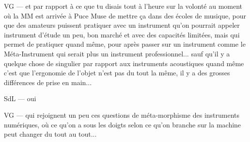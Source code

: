 VG — et par rapport à ce que tu disais tout à l'heure sur la volonté au moment où la MM est arrivée à Puce Muse de mettre ça dans des écoles de musique, pour que des amateurs puissent pratiquer avec un instrument qu'on pourrait appeler instrument d'étude un peu, bon marché et avec des capacités limitées, mais qui permet de pratiquer quand même, pour après passer sur un instrument comme le Méta-Instrument qui serait plus un instrument professionnel... sauf qu'il y a quelque chose de singulier par rapport aux instruments acoustiques quand même c'est que l'ergonomie de l'objet n'est pas du tout la même, il y a des grosses différences de prise en main... 

SdL — oui 

VG — qui rejoignent un peu ces questions de méta-morphisme des instruments numériques, où ce qu'on a sous les doigts selon ce qu'on branche sur la machine peut changer du tout au tout... 


